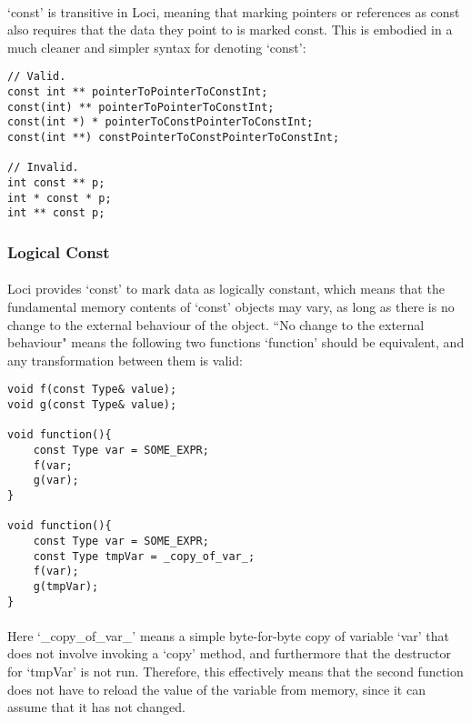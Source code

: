 \documentclass[12pt,twoside,notitlepage]{report}
\begin{document}
\paragraph{}
`const' is transitive in Loci, meaning that marking pointers or references as const also requires that the data they point to is marked const. This is embodied in a much cleaner and simpler syntax for denoting `const':

\begin{lstlisting}
// Valid.
const int ** pointerToPointerToConstInt;
const(int) ** pointerToPointerToConstInt;
const(int *) * pointerToConstPointerToConstInt;
const(int **) constPointerToConstPointerToConstInt;

// Invalid.
int const ** p;
int * const * p;
int ** const p;
\end{lstlisting}

\subsubsection{Logical Const}

\paragraph{}
Loci provides `const' to mark data as logically constant, which means that the fundamental memory contents of `const' objects may vary, as long as there is no change to the external behaviour of the object. ``No change to the external behaviour" means the following two functions `function' should be equivalent, and any transformation between them is valid:

\begin{lstlisting}
void f(const Type& value);
void g(const Type& value);

void function(){
	const Type var = SOME_EXPR;
	f(var;
	g(var);
}

void function(){
	const Type var = SOME_EXPR;
	const Type tmpVar = _copy_of_var_;
	f(var);
	g(tmpVar);
}
\end{lstlisting}

\paragraph{}
Here `\_copy\_of\_var\_' means a simple byte-for-byte copy of variable `var' that does not involve invoking a `copy' method, and furthermore that the destructor for `tmpVar' is not run. Therefore, this effectively means that the second function does not have to reload the value of the variable from memory, since it can assume that it has not changed.
\end{document}
